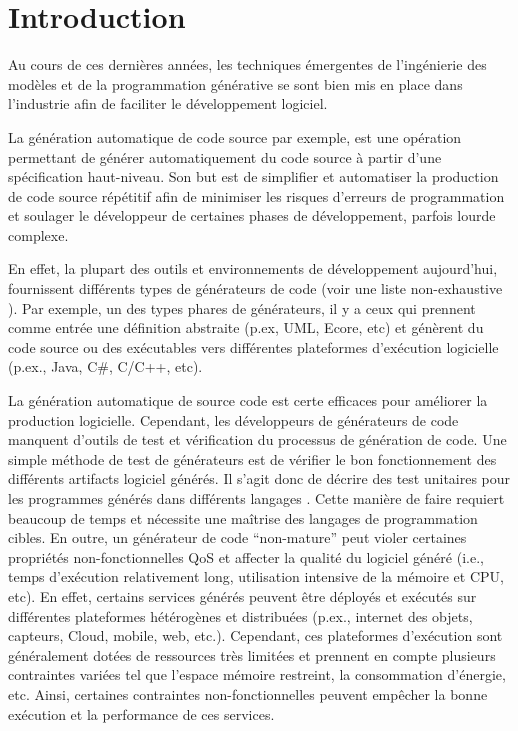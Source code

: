 \chapter*{Introduction}


Au cours de ces dernières années, les techniques émergentes de l’ingénierie des modèles et de la programmation générative se sont bien mis en place dans l’industrie afin de faciliter le développement logiciel.

La génération automatique de code source par exemple, est une opération permettant de générer automatiquement du code source à partir d’une spécification haut-niveau. Son but est de simplifier et automatiser la production de code source répétitif afin de minimiser les risques d'erreurs de programmation et soulager le développeur de certaines phases de développement, parfois lourde complexe.

En effet, la plupart des outils et environnements de développement aujourd’hui, fournissent différents types de générateurs de code (voir une liste non-exhaustive \cite{liste_generateurs}). Par exemple, un des types phares de générateurs, il y a ceux qui prennent comme entrée une définition abstraite (p.ex, UML, Ecore, etc) et génèrent du code source ou des exécutables vers différentes plateformes d’exécution logicielle (p.ex., Java, C\#, C/C++, etc).


La génération automatique de source code est certe efficaces pour améliorer la production logicielle. Cependant, les développeurs de générateurs de code manquent d’outils de test et vérification du processus de génération de code. Une simple méthode de test de générateurs est de vérifier le bon fonctionnement des différents artifacts logiciel générés. Il s’agit donc de décrire des test unitaires pour les programmes générés dans différents langages . Cette manière de faire requiert beaucoup de temps et nécessite une maîtrise des langages de programmation cibles.
En outre, un générateur de code “non-mature” peut violer certaines propriétés non-fonctionnelles QoS et affecter la qualité du logiciel généré (i.e., temps d'exécution relativement long, utilisation intensive de la mémoire et CPU, etc). En effet, certains services générés peuvent être déployés et exécutés sur différentes plateformes hétérogènes et distribuées (p.ex., internet des objets, capteurs, Cloud, mobile, web, etc.). Cependant, ces plateformes d’exécution sont généralement dotées de ressources très limitées et prennent en compte plusieurs contraintes variées tel que l’espace mémoire restreint, la consommation d’énergie, etc. Ainsi, certaines contraintes non-fonctionnelles peuvent empêcher la bonne exécution et la performance de ces services.


